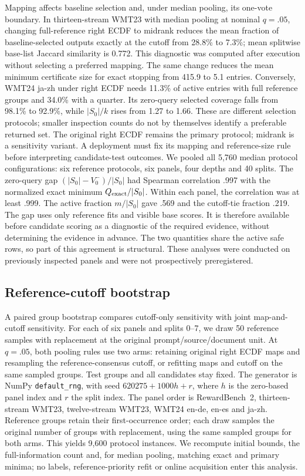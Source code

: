 Mapping affects baseline selection and, under median pooling, its one-vote boundary. In thirteen-stream WMT23 with median pooling at nominal $q=.05$, changing full-reference right ECDF to midrank reduces the mean fraction of baseline-selected outputs exactly at the cutoff from 28.8\% to 7.3\%; mean splitwise base-list Jaccard similarity is 0.772. This diagnostic was computed after execution without selecting a preferred mapping. The same change reduces the mean minimum certificate size for exact stopping from 415.9 to 5.1 entries. Conversely, WMT24 ja-zh under right ECDF needs 11.3\% of active entries with full reference groups and 34.0\% with a quarter. Its zero-query selected coverage falls from 98.1\% to 92.9\%, while $|S_0|/k$ rises from 1.27 to 1.66. These are different selection protocols; smaller inspection counts do not by themselves identify a preferable returned set. The original right ECDF remains the primary protocol; midrank is a sensitivity variant. A deployment must fix its mapping and reference-size rule before interpreting candidate-test outcomes. We pooled all 5,760 median protocol configurations: six reference protocols, six panels, four depths and 40 splits. The zero-query gap $(|S_0|-V^-_0)/|S_0|$ had Spearman correlation .997 with the normalized exact minimum $Q_{\rm exact}/|S_0|$. Within each panel, the correlation was at least .999. The active fraction $m/|S_0|$ gave .569 and the cutoff-tie fraction .219. The gap uses only reference fits and visible base scores. It is therefore available before candidate scoring as a diagnostic of the required evidence, without determining the evidence in advance. The two quantities share the active safe rows, so part of this agreement is structural. These analyses were conducted on previously inspected panels and were not prospectively preregistered.




\subsection{Reference-cutoff bootstrap}
\label{app:cutoff-bootstrap}
A paired group bootstrap compares cutoff-only sensitivity with joint map-and-cutoff sensitivity. For each of six panels and splits 0--7, we draw 50 reference samples with replacement at the original prompt/source/document unit. At $q=.05$, both pooling rules use two arms: retaining original right ECDF maps and resampling the reference-consensus cutoff, or refitting maps and cutoff on the same sampled groups. Test groups and all candidates stay fixed. The generator is NumPy \texttt{default\_rng}, with seed $620275+1000h+r$, where $h$ is the zero-based panel index and $r$ the split index. The panel order is RewardBench~2, thirteen-stream WMT23, twelve-stream WMT23, WMT24 en-de, en-es and ja-zh. Reference groups retain their first-occurrence order; each draw samples the original number of groups with replacement, using the same sampled groups for both arms. This yields 9,600 protocol instances. We recompute initial bounds, the full-information count and, for median pooling, matching exact and primary minima; no labels, reference-priority refit or online acquisition enter this analysis.

